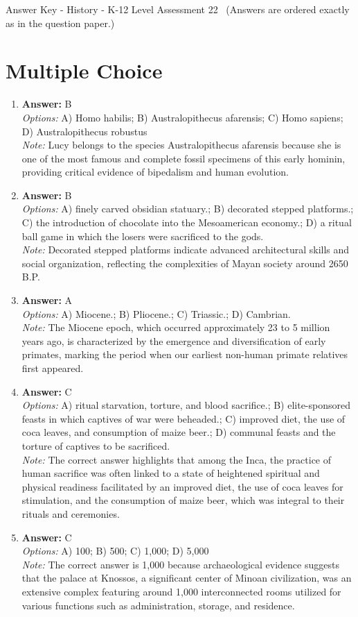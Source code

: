 \documentclass[12pt]{article}
\begin{document}
\begin{center}
Answer Key - History - K-12 Level Assessment 22 \
\small (Answers are ordered exactly as in the question paper.)
\end{center}

\section*{Multiple Choice}
\begin{enumerate}[label=\arabic*.]
\item \textbf{Answer:} B
\\ \textit{Options:} A) Homo habilis; B) Australopithecus afarensis; C) Homo sapiens; D) Australopithecus robustus
\\ \textit{Note:} Lucy belongs to the species Australopithecus afarensis because she is one of the most famous and complete fossil specimens of this early hominin, providing critical evidence of bipedalism and human evolution.
\item \textbf{Answer:} B
\\ \textit{Options:} A) finely carved obsidian statuary.; B) decorated stepped platforms.; C) the introduction of chocolate into the Mesoamerican economy.; D) a ritual ball game in which the losers were sacrificed to the gods.
\\ \textit{Note:} Decorated stepped platforms indicate advanced architectural skills and social organization, reflecting the complexities of Mayan society around 2650 B.P.
\item \textbf{Answer:} A
\\ \textit{Options:} A) Miocene.; B) Pliocene.; C) Triassic.; D) Cambrian.
\\ \textit{Note:} The Miocene epoch, which occurred approximately 23 to 5 million years ago, is characterized by the emergence and diversification of early primates, marking the period when our earliest non-human primate relatives first appeared.
\item \textbf{Answer:} C
\\ \textit{Options:} A) ritual starvation, torture, and blood sacrifice.; B) elite-sponsored feasts in which captives of war were beheaded.; C) improved diet, the use of coca leaves, and consumption of maize beer.; D) communal feasts and the torture of captives to be sacrificed.
\\ \textit{Note:} The correct answer highlights that among the Inca, the practice of human sacrifice was often linked to a state of heightened spiritual and physical readiness facilitated by an improved diet, the use of coca leaves for stimulation, and the consumption of maize beer, which was integral to their rituals and ceremonies.
\item \textbf{Answer:} C
\\ \textit{Options:} A) 100; B) 500; C) 1,000; D) 5,000
\\ \textit{Note:} The correct answer is 1,000 because archaeological evidence suggests that the palace at Knossos, a significant center of Minoan civilization, was an extensive complex featuring around 1,000 interconnected rooms utilized for various functions such as administration, storage, and residence.
\end{enumerate}
\end{document}
